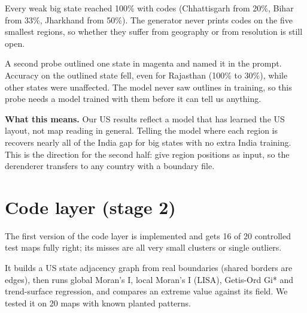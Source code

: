 \documentclass[11pt,a4paper]{article}
\begin{document}
Every weak big state reached 100\% with codes (Chhattisgarh from 20\%, Bihar from 33\%, Jharkhand from 50\%). The generator never prints codes on the five smallest regions, so whether they suffer from geography or from resolution is still open.

A second probe outlined one state in magenta and named it in the prompt. Accuracy on the outlined state fell, even for Rajasthan (100\% to 30\%), while other states were unaffected. The model never saw outlines in training, so this probe needs a model trained with them before it can tell us anything.

\textbf{What this means.} Our US results reflect a model that has learned the US layout, not map reading in general. Telling the model where each region is recovers nearly all of the India gap for big states with no extra India training. This is the direction for the second half: give region positions as input, so the derenderer transfers to any country with a boundary file.

\section{Code layer (stage 2)}
The first version of the code layer is implemented and gets 16 of 20 controlled test maps fully right; its misses are all very small clusters or single outliers.

It builds a US state adjacency graph from real boundaries (shared borders are edges), then runs global Moran's I, local Moran's I (LISA), Getis-Ord Gi* and trend-surface regression, and compares an extreme value against its field. We tested it on 20 maps with known planted patterns.
\end{document}
